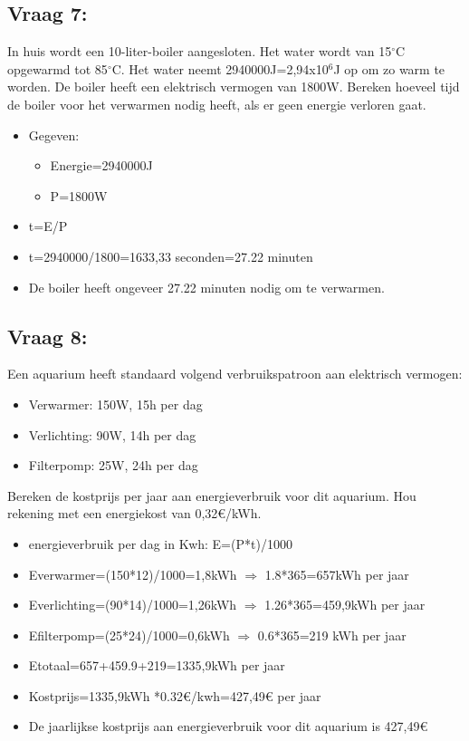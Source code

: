 \documentclass[12pt]{article}
\begin{document}
\subsection{Vraag 7:}
In huis wordt een 10-liter-boiler aangesloten. Het water wordt van 15$^{\circ}$C opgewarmd tot 85$^{\circ}$C. Het water neemt 2940000J=2,94x10$^6$J op om zo warm te worden. De boiler heeft een elektrisch vermogen van 1800W. Bereken hoeveel tijd de boiler voor het verwarmen nodig heeft, als er geen energie verloren gaat.
\begin{itemize}
    \item[] Gegeven:\begin{itemize}
        \item Energie=2940000J
        \item P=1800W
    \end{itemize}
\end{itemize}
\begin{itemize}
    \item t=E/P 
    \item t=2940000/1800=1633,33 seconden=27.22 minuten
    \item De boiler heeft ongeveer 27.22 minuten nodig om te verwarmen.
\end{itemize}
\subsection{Vraag 8:}
Een aquarium heeft standaard volgend verbruikspatroon aan elektrisch vermogen:\begin{itemize}
    \item Verwarmer: 150W, 15h per dag
    \item Verlichting: 90W, 14h per dag
    \item Filterpomp: 25W, 24h per dag
\end{itemize}
Bereken de kostprijs per jaar aan energieverbruik voor dit aquarium. Hou rekening met een energiekost van 0,32€/kWh.
\begin{itemize}
    \item energieverbruik per dag in Kwh: E=(P*t)/1000
    \item Everwarmer=(150*12)/1000=1,8kWh $\Rightarrow$ 1.8*365=657kWh per jaar
    \item Everlichting=(90*14)/1000=1,26kWh $\Rightarrow$ 1.26*365=459,9kWh per jaar
    \item Efilterpomp=(25*24)/1000=0,6kWh $\Rightarrow$ 0.6*365=219 kWh per jaar
    \item Etotaal=657+459.9+219=1335,9kWh per jaar
    \item Kostprijs=1335,9kWh *0.32€/kwh=427,49€ per jaar
    \item De jaarlijkse kostprijs aan energieverbruik voor dit aquarium is 427,49€
\end{itemize}
\end{document}
